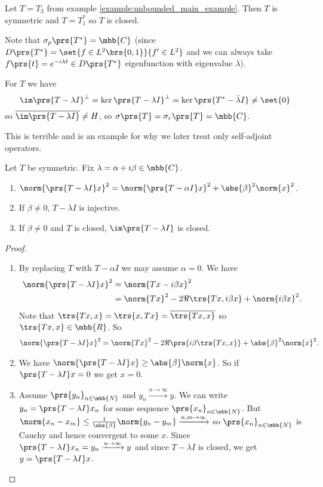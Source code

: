 \documentclass[10pt, twoside]{book}
\begin{document}
\begin{example}
Let $T = T_3$ from example \ref{example:unbounded_main_example}. Then $T$ is symmetric and $T = T_1^*$ so $T$ is closed.

Note that $\sigma_p\prs{T^*} = \mbb{C}$ (since $D\prs{T^*} = \set{f \in L^2\brs{0,1}}{f' \in L^2}$ and we can always take $f\prs{t} = e^{-i\lambda t} \in D\prs{T^*}$ eigenfunction with eigenvalue $\lambda$).

For $T$ we have
\[\im\prs{T - \lambda I}^\perp = \ker\prs{T - \lambda I}^\perp = \ker\prs{T^* - \bar{\lambda} I} \neq \set{0}\]
so $\overline{\im\prs{T - \lambda I}} \neq H$, so $\sigma\prs{T} = \sigma_r\prs{T} = \mbb{C}$.

This is terrible and is an example for why we later treat only self-adjoint operators.
\end{example}

\begin{proposition}
Let $T$ be symmetric. Fix $\lambda = \alpha + i \beta \in \mbb{C}$.
\begin{enumerate}
\item $\norm{\prs{T - \lambda I}x}^2 = \norm{\prs{T - \alpha I}x}^2 + \abs{\beta}^2 \norm{x}^2$.
\item If $\beta \neq 0$, $T - \lambda I$ is injective.
\item If $\beta \neq 0$ and $T$ is closed, $\im\prs{T - \lambda I}$ is closed.
\end{enumerate}
\end{proposition}

\begin{proof}
\begin{enumerate}
\item By replacing $T$ with $T - \alpha I$ we may assume $\alpha = 0$. We have
\begin{align*}
\norm{\prs{T - \lambda I} x}^2 &= \norm{Tx - i \beta x}^2
\\&= \norm{Tx}^2 -2\Re\trs{Tx, i\beta x} + \norm{i\beta x}^2 \text{.}
\end{align*}
Note that $\trs{Tx, x} = \trs{x, Tx} = \overline{\trs{Tx, x}}$ so $\trs{Tx, x} \in \mbb{R}$. So
\begin{align*}
\norm{\prs{T -\lambda I}x}^2 = \norm{Tx}^2 - 2\Re\prs{i\beta \trs{Tx, x}} + \abs{\beta}^2 \norm{x}^2 \text{.}
\end{align*}
\item We have $\norm{\prs{T- \lambda I}x} \geq \abs{\beta} \norm{x}$. So if $\prs{T - \lambda I}x = 0$ we get $x=0$.
\item Assume $\prs{y_n}_{n \in \mbb{N}}$ and $y_n \xrightarrow{n\to\infty} y$. We can write $y_n = \prs{T - \lambda I}x_n$ for some sequence $\prs{x_n}_{n \in \mbb{N}}$. But $\norm{x_n - x_m} \leq \frac{1}{\abs{\beta}} \norm{y_n - y_m} \xrightarrow{n,m\to\infty}$ so $\prs{x_n}_{n \in \mbb{N}}$ is Cauchy and hence convergent to some $x$. Since $\prs{T - \lambda I}x_n = y_n \xrightarrow{n\to\infty} y$ and since $T - \lambda I$ is closed, we get $y = \prs{T - \lambda I} x$.
\end{enumerate}
\end{proof}
\end{document}
